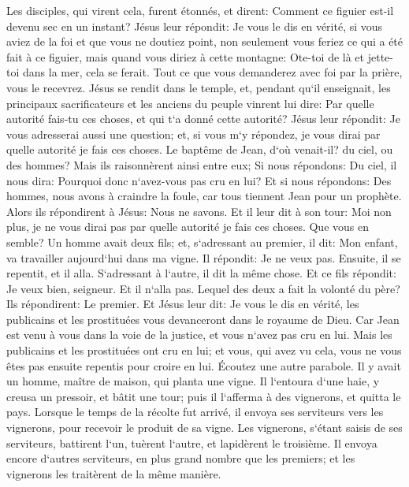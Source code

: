 \verse Les disciples, qui virent cela, furent étonnés, et dirent: Comment ce figuier est-il devenu sec en un instant? 
\verse Jésus leur répondit: Je vous le dis en vérité, si vous aviez de la foi et que vous ne doutiez point, non seulement vous feriez ce qui a été fait à ce figuier, mais quand vous diriez à cette montagne: Ote-toi de là et jette-toi dans la mer, cela se ferait. 
\verse Tout ce que vous demanderez avec foi par la prière, vous le recevrez. 
\verse Jésus se rendit dans le temple, et, pendant qu`il enseignait, les principaux sacrificateurs et les anciens du peuple vinrent lui dire: Par quelle autorité fais-tu ces choses, et qui t`a donné cette autorité? 
\verse Jésus leur répondit: Je vous adresserai aussi une question; et, si vous m`y répondez, je vous dirai par quelle autorité je fais ces choses. 
\verse Le baptême de Jean, d`où venait-il? du ciel, ou des hommes? Mais ils raisonnèrent ainsi entre eux; Si nous répondons: Du ciel, il nous dira: Pourquoi donc n`avez-vous pas cru en lui? 
\verse Et si nous répondons: Des hommes, nous avons à craindre la foule, car tous tiennent Jean pour un prophète. 
\verse Alors ils répondirent à Jésus: Nous ne savons. Et il leur dit à son tour: Moi non plus, je ne vous dirai pas par quelle autorité je fais ces choses. 
\verse Que vous en semble? Un homme avait deux fils; et, s`adressant au premier, il dit: Mon enfant, va travailler aujourd`hui dans ma vigne. 
\verse Il répondit: Je ne veux pas. Ensuite, il se repentit, et il alla. 
\verse S`adressant à l`autre, il dit la même chose. Et ce fils répondit: Je veux bien, seigneur. Et il n`alla pas. 
\verse Lequel des deux a fait la volonté du père? Ils répondirent: Le premier. Et Jésus leur dit: Je vous le dis en vérité, les publicains et les prostituées vous devanceront dans le royaume de Dieu. 
\verse Car Jean est venu à vous dans la voie de la justice, et vous n`avez pas cru en lui. Mais les publicains et les prostituées ont cru en lui; et vous, qui avez vu cela, vous ne vous êtes pas ensuite repentis pour croire en lui. 
\verse Écoutez une autre parabole. Il y avait un homme, maître de maison, qui planta une vigne. Il l`entoura d`une haie, y creusa un pressoir, et bâtit une tour; puis il l`afferma à des vignerons, et quitta le pays. 
\verse Lorsque le temps de la récolte fut arrivé, il envoya ses serviteurs vers les vignerons, pour recevoir le produit de sa vigne. 
\verse Les vignerons, s`étant saisis de ses serviteurs, battirent l`un, tuèrent l`autre, et lapidèrent le troisième. 
\verse Il envoya encore d`autres serviteurs, en plus grand nombre que les premiers; et les vignerons les traitèrent de la même manière. 
